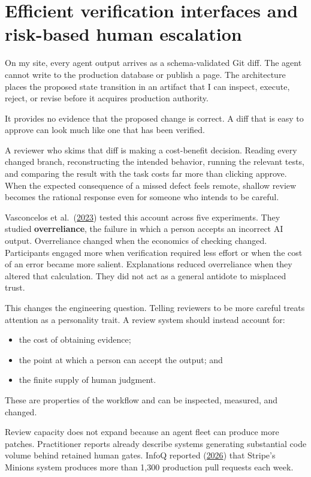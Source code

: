 \chapter{Efficient verification interfaces and risk-based human escalation}
\label{ch15-verification-interfaces-risk-based-escalation}
On my site, every agent output arrives as a schema-validated Git diff. The agent cannot write to the production database or publish a page. The architecture places the proposed state transition in an artifact that I can inspect, execute, reject, or revise before it acquires production authority.

It provides no evidence that the proposed change is correct. A diff that is easy to approve can look much like one that has been verified.

A reviewer who skims that diff is making a cost-benefit decision. Reading every changed branch, reconstructing the intended behavior, running the relevant tests, and comparing the result with the task costs far more than clicking approve. When the expected consequence of a missed defect feels remote, shallow review becomes the rational response even for someone who intends to be careful.

Vasconcelos et al.~(\href{https://arxiv.org/abs/2212.06823}{2023}) tested this account across five experiments. They studied \textbf{overreliance}, the failure in which a person accepts an incorrect AI output. Overreliance changed when the economics of checking changed. Participants engaged more when verification required less effort or when the cost of an error became more salient. Explanations reduced overreliance when they altered that calculation. They did not act as a general antidote to misplaced trust.

This changes the engineering question. Telling reviewers to be more careful treats attention as a personality trait. A review system should instead account for:

\begin{itemize}
\tightlist
\item
  the cost of obtaining evidence;
\item
  the point at which a person can accept the output; and
\item
  the finite supply of human judgment.
\end{itemize}

These are properties of the workflow and can be inspected, measured, and changed.

Review capacity does not expand because an agent fleet can produce more patches. Practitioner reports already describe systems generating substantial code volume behind retained human gates. InfoQ reported (\href{https://www.infoq.com/news/2026/03/stripe-autonomous-coding-agents/}{2026}) that Stripe's Minions system produces more than 1,300 production pull requests each week.

